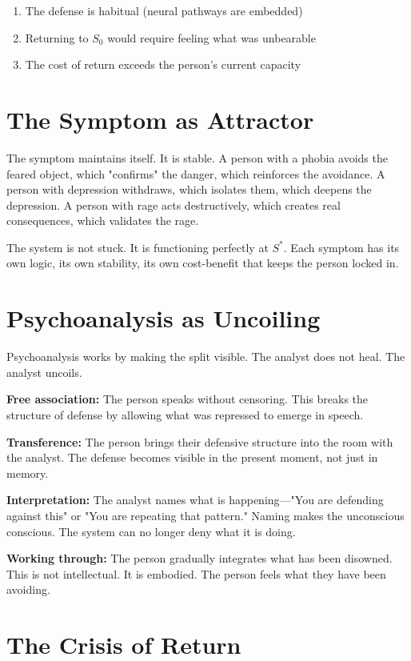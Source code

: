 \documentclass[12pt]{article}
\begin{document}
\begin{enumerate}
\item The defense is habitual (neural pathways are embedded)
\item Returning to $S_0$ would require feeling what was unbearable
\item The cost of return exceeds the person's current capacity
\end{enumerate}

\section{The Symptom as Attractor}

The symptom maintains itself. It is stable. A person with a phobia avoids the feared object, which "confirms" the danger, which reinforces the avoidance. A person with depression withdraws, which isolates them, which deepens the depression. A person with rage acts destructively, which creates real consequences, which validates the rage.

The system is not stuck. It is functioning perfectly at $S^*$. Each symptom has its own logic, its own stability, its own cost-benefit that keeps the person locked in.

\section{Psychoanalysis as Uncoiling}

Psychoanalysis works by making the split visible. The analyst does not heal. The analyst uncoils.

\textbf{Free association:} The person speaks without censoring. This breaks the structure of defense by allowing what was repressed to emerge in speech.

\textbf{Transference:} The person brings their defensive structure into the room with the analyst. The defense becomes visible in the present moment, not just in memory.

\textbf{Interpretation:} The analyst names what is happening—"You are defending against this" or "You are repeating that pattern." Naming makes the unconscious conscious. The system can no longer deny what it is doing.

\textbf{Working through:} The person gradually integrates what has been disowned. This is not intellectual. It is embodied. The person feels what they have been avoiding.

\section{The Crisis of Return}
\end{document}
